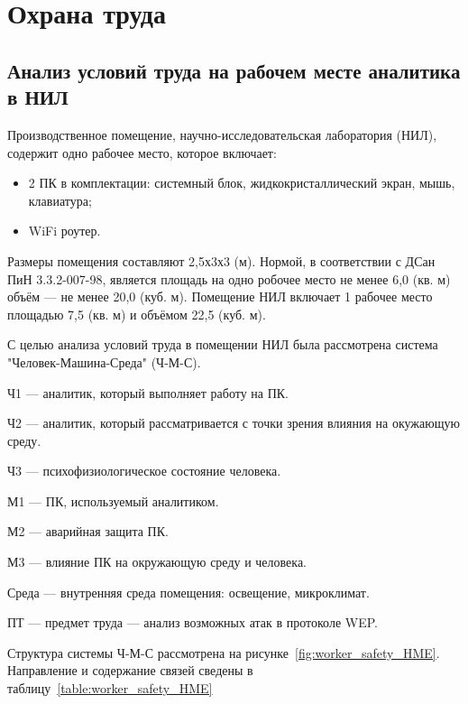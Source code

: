 \chapter{Охрана труда}

\section{Анализ условий труда на рабочем месте аналитика в НИЛ}

Производственное помещение, научно-исследовательская лаборатория (НИЛ), содержит
одно рабочее место, которое включает:

\begin{itemize}

    \item 2 ПК в комплектации: системный блок, жидкокристаллический экран, мышь, клавиатура;

    \item WiFi роутер.

\end{itemize}

Размеры помещения составляют 2,5х3х3 (м). Нормой, в соответствии с ДСан ПиН
3.3.2-007-98, является площадь на одно робочее место не менее 6,0 (кв. м) объём
--- не менее 20,0 (куб. м). Помещение НИЛ включает 1 рабочее место площадью 7,5
(кв. м) и объёмом 22,5 (куб. м).

С целью анализа условий труда в помещении НИЛ была рассмотрена система
"Человек-Машина-Среда" (Ч-М-С).

Ч1 --- аналитик, который выполняет работу на ПК.

Ч2 --- аналитик, который рассматривается с точки зрения влияния на окужающую
среду.

Ч3 --- психофизиологическое состояние человека.

М1 --- ПК, используемый аналитиком.

М2 --- аварийная защита ПК.

М3 --- влияние ПК на окружающую среду и человека.

Среда --- внутренняя среда помещения: освещение, микроклимат.

ПТ --- предмет труда --- анализ возможных атак в протоколе WEP.

Структура системы Ч-М-С рассмотрена на рисунке~\ref{fig:worker_safety_HME}.
Направление и содержание связей сведены в таблицу~\ref{table:worker_safety_HME}

